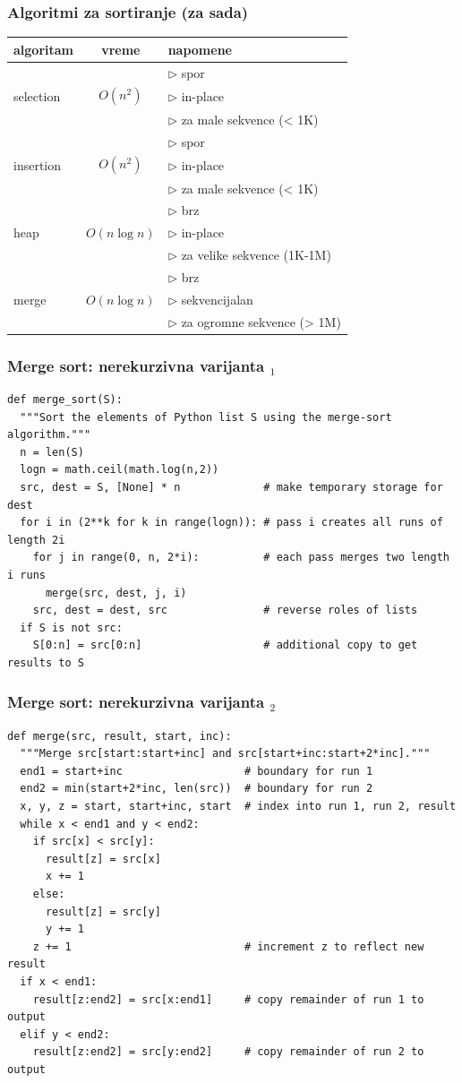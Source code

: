 \documentclass[compress,aspectratio=169]{beamer}
\begin{document}
\begin{frame}[fragile]
  \frametitle{Algoritmi za sortiranje (za sada)}
  \begin{tabular}{l|c|p{6cm}}
  \textbf{algoritam} & \textbf{vreme} & \textbf{napomene} \\ \hline\hline
   &  & $\rhd$ spor \\ 
  selection & $O(n^2)$ & $\rhd$ in-place \\ 
   &  & $\rhd$ za male sekvence (< 1K) \\ \hline
   &  & $\rhd$ spor \\ 
  insertion & $O(n^2)$ & $\rhd$ in-place \\ 
   &  & $\rhd$ za male sekvence (< 1K) \\ \hline
   &  & $\rhd$ brz \\
  heap & $O(n\log n)$ & $\rhd$ in-place \\
   &  & $\rhd$ za velike sekvence (1K-1M) \\ \hline
   &  & $\rhd$ brz \\
  merge & $O(n\log n)$ & $\rhd$ sekvencijalan \\
   &  & $\rhd$ za ogromne sekvence (> 1M) \\ \hline
  \end{tabular}
\end{frame}

\begin{frame}[fragile,shrink=25]
  \frametitle{Merge sort: nerekurzivna varijanta $_1$}
\begin{verbatim}
def merge_sort(S):
  """Sort the elements of Python list S using the merge-sort algorithm."""
  n = len(S)
  logn = math.ceil(math.log(n,2))
  src, dest = S, [None] * n             # make temporary storage for dest
  for i in (2**k for k in range(logn)): # pass i creates all runs of length 2i
    for j in range(0, n, 2*i):          # each pass merges two length i runs
      merge(src, dest, j, i)
    src, dest = dest, src               # reverse roles of lists
  if S is not src:
    S[0:n] = src[0:n]                   # additional copy to get results to S
\end{verbatim}
\end{frame}

\begin{frame}[fragile,shrink=25]
  \frametitle{Merge sort: nerekurzivna varijanta $_2$}
\begin{verbatim}
def merge(src, result, start, inc):
  """Merge src[start:start+inc] and src[start+inc:start+2*inc]."""
  end1 = start+inc                   # boundary for run 1
  end2 = min(start+2*inc, len(src))  # boundary for run 2
  x, y, z = start, start+inc, start  # index into run 1, run 2, result
  while x < end1 and y < end2:
    if src[x] < src[y]:
      result[z] = src[x]
      x += 1
    else:
      result[z] = src[y]
      y += 1
    z += 1                           # increment z to reflect new result
  if x < end1:
    result[z:end2] = src[x:end1]     # copy remainder of run 1 to output
  elif y < end2:
    result[z:end2] = src[y:end2]     # copy remainder of run 2 to output
\end{verbatim}
\end{frame}
\end{document}
